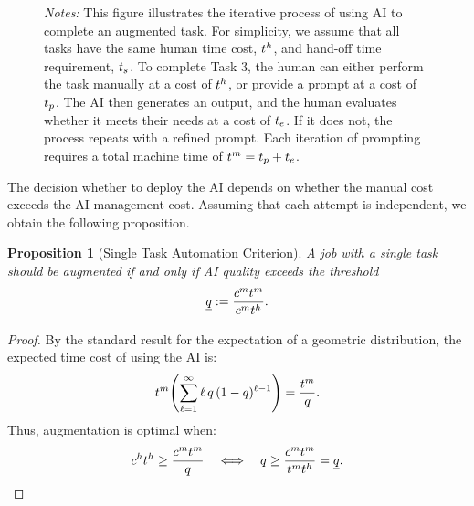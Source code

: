 \documentclass{article}
\theoremstyle{plain}
\theoremstyle{plain}
\newtheorem{proposition}[theorem]{Proposition}
\begin{document}
\begin{figure}[h!]
\begin{center}
{}
   \end{center}
  \footnotesize{
  \emph{Notes:} This figure illustrates the iterative process of using AI to complete an augmented task.  
  For simplicity, we assume that all tasks have the same human time cost, $t^{h}_{}$, and hand-off time requirement, $t_{s}$.  
  To complete Task 3, the human can either perform the task manually at a cost of $t^{h}_{}$, or provide a prompt at a cost of $t_{p}$. 
  The AI then generates an output, and the human evaluates whether it meets their needs at a cost of $t_{e}$.  
  If it does not, the process repeats with a refined prompt.  
  Each iteration of prompting requires a total machine time of $t^{m}_{} = t_{p} + t_{e}$.}
\end{figure}

The decision whether to deploy the AI depends on whether the manual cost exceeds the AI management cost.
Assuming that each attempt is independent, we obtain the following proposition.

\begin{proposition}[Single Task Automation Criterion] 
\label{proposition:single}
A job with a single task should be augmented if and only if AI quality exceeds the threshold
$$\underline{q} := \frac{c^{m}_{} t^{m}_{}}{c^{m}_{} t^{h}_{}}.$$
\end{proposition}

\begin{proof}
By the standard result for the expectation of a geometric distribution, the expected time cost of using the AI is:
$$t^{m}_{} \Biggl( \sum_{\ell=1}^{\infty} \ell\,q\,(1 - q)^{\ell - 1} \Biggr) = \frac{t^{m}_{}}{q}.$$
Thus, augmentation is optimal when:
$$c^{h}_{} t^{h}_{} \geq \frac{c^{m}_{} t^{m}_{}}{q} \quad \Longleftrightarrow \quad q \geq \frac{c^{m}_{} t^{m}_{}}{t^{m}_{} t^{h}_{}} = \underline{q}.$$
\end{proof}
\end{document}
